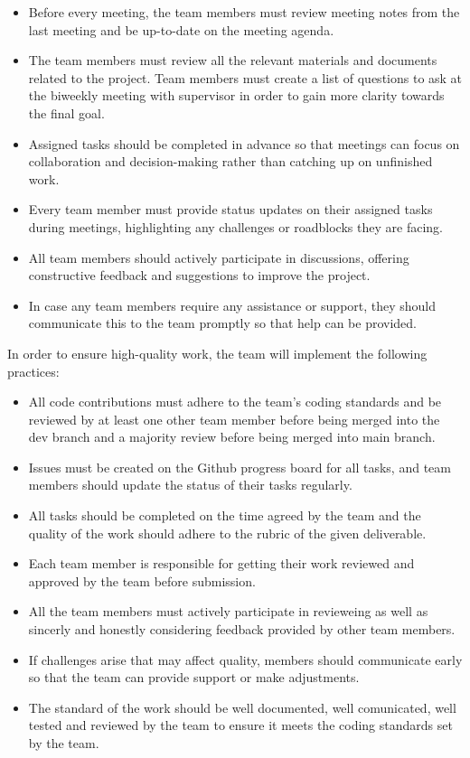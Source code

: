 \documentclass{article}
\begin{document}
\begin{enumerate}
\begin{itemize}
  \item Before every meeting, the team members must review meeting notes from the last meeting and be up-to-date on the meeting agenda.
  \item The team members must review all the relevant materials and documents related to the project. Team members must create a list of questions to ask at the biweekly meeting with supervisor in order to gain more clarity towards the final goal.
  \item Assigned tasks should be completed in advance so that meetings can focus on collaboration and decision-making rather than catching up on unfinished work.
  \item Every team member must provide status updates on their assigned tasks during meetings, highlighting any challenges or roadblocks they are facing.
  \item All team members should actively participate in discussions, offering constructive feedback and suggestions to improve the project.
  \item In case any team members require any assistance or support, they should communicate this to the team promptly so that help can be provided.
\end{itemize}

\noindent In order to ensure high-quality work, the team will implement the following practices:

\begin{itemize}
  \item All code contributions must adhere to the team's coding standards and be reviewed by at least one other team member before being merged 
  into the dev branch and a majority review before being merged into main branch.
  \item Issues must be created on the Github progress board for all tasks, and team members should update the status of their tasks regularly.
  \item All tasks should be completed on the time agreed by the team and the quality of the work should adhere to the rubric of the given deliverable.
  \item Each team member is responsible for getting their work reviewed and approved by the team before submission.
  \item All the team members must actively participate in revieweing as well as sincerly and honestly considering feedback provided by other team members.
  \item If challenges arise that may affect quality, members should communicate early so that the team can provide support or make adjustments.
  \item The standard of the work should be well documented, well comunicated, well tested and reviewed by the team to ensure it meets the coding standards set by the team.
\end{itemize}


\end{enumerate}
\end{document}
